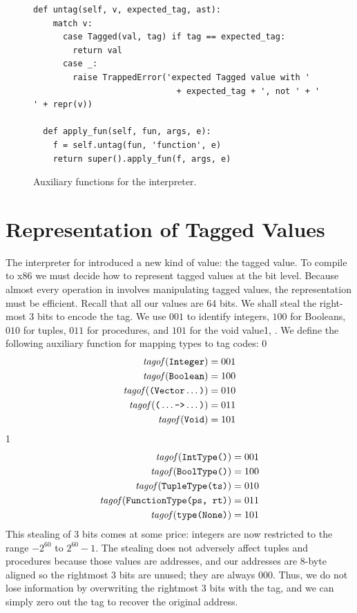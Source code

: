 \documentclass[7x10]{TimesAPriori_MIT}%
\def\racketEd{0}
\def\pythonEd{1}
\def\edition{1}
\newcommand{\pythonColor}[0]{}
\newcommand{\python}[1]{{\if\edition\pythonEd\pythonColor #1\fi}}
\numberwithin{theorem}{chapter}
\numberwithin{definition}{chapter}
\numberwithin{equation}{chapter}
\begin{document}
\begin{figure}[tbp]
\begin{tcolorbox}[colback=white]
{\begin{lstlisting}[basicstyle=\ttfamily\footnotesize]
  def untag(self, v, expected_tag, ast):
    match v:
      case Tagged(val, tag) if tag == expected_tag:
        return val
      case _:
        raise TrappedError('expected Tagged value with '
                             + expected_tag + ', not ' + ' ' + repr(v))

  def apply_fun(self, fun, args, e):
    f = self.untag(fun, 'function', e)
    return super().apply_fun(f, args, e)
\end{lstlisting}
\fi}
  \end{tcolorbox}

  \caption{Auxiliary functions for the \LangDyn{} interpreter.}
\label{fig:interp-Ldyn-aux}
\end{figure}


\section{Representation of Tagged Values}

The interpreter for \LangDyn{} introduced a new kind of value: the
tagged value. To compile \LangDyn{} to x86 we must decide how to
represent tagged values at the bit level. Because almost every
operation in \LangDyn{} involves manipulating tagged values, the
representation must be efficient. Recall that all our values are 64
bits.  We shall steal the right-most $3$ bits to encode the tag.  We use
$001$ to identify integers, $100$ for Booleans, $010$ for tuples,
$011$ for procedures, and $101$ for the void value\python{,
  }. We define the following auxiliary function for mapping
types to tag codes:
%
{\if\edition\racketEd
\begin{align*}
\mathit{tagof}(\texttt{Integer}) &= 001 \\
\mathit{tagof}(\texttt{Boolean}) &= 100 \\
\mathit{tagof}(\texttt{(}\texttt{Vector} \ldots\texttt{)}) &= 010 \\
\mathit{tagof}(\texttt{(}\ldots \texttt{->} \ldots\texttt{)}) &= 011 \\
\mathit{tagof}(\texttt{Void}) &= 101
\end{align*}
\fi}
{\if\edition\pythonEd\pythonColor
\begin{align*}
\mathit{tagof}(\texttt{IntType()}) &= 001 \\
\mathit{tagof}(\texttt{BoolType()}) &= 100 \\
\mathit{tagof}(\texttt{TupleType(ts)}) &= 010 \\
\mathit{tagof}(\texttt{FunctionType(ps, rt)}) &= 011 \\
\mathit{tagof}(\texttt{type(None)}) &= 101
\end{align*}
\fi}
%
This stealing of 3 bits comes at some price: integers are now restricted
to the range $-2^{60}$ to $2^{60}-1$. The stealing does not adversely
affect tuples and procedures because those values are addresses, and
our addresses are 8-byte aligned so the rightmost 3 bits are unused;
they are always $000$. Thus, we do not lose information by overwriting
the rightmost 3 bits with the tag, and we can simply zero out the tag
to recover the original address.
\end{document}

